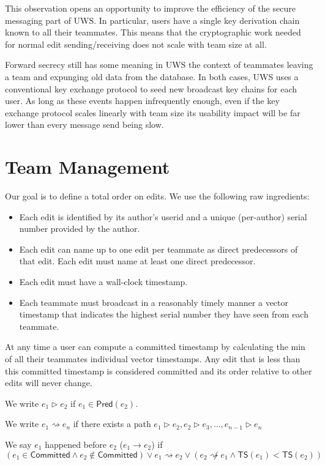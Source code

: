 \documentclass{article}
\begin{document}
This observation opens an opportunity to improve the efficiency of the secure messaging part of UWS.
In particular, users have a single key derivation chain known to all their teammates.
This means that the cryptographic work needed for normal edit sending{\slash}receiving does not scale with team size at all.

Forward secrecy still has some meaning in UWS the context of teammates leaving a team and expunging old data from the database.
In both cases, UWS uses a conventional key exchange protocol to seed new broadcast key chains for each user.
As long as these events happen infrequently enough, even if the key exchange protocol scales linearly with team size its usability impact will be far lower than every message send being slow.

\section{Team Management}

Our goal is to define a total order on edits.
We use the following raw ingredients:

\begin{itemize}
\item Each edit is identified by its author's userid and a unique (per-author) serial number provided by the author.
\item Each edit can name up to one edit per teammate as direct predecessors of that edit.
  Each edit must name at least one direct predecessor.
\item Each edit must have a wall-clock timestamp.
\item Each teammate must broadcast in a reasonably timely manner a vector timestamp that indicates the highest serial number they have seen from each teammate.
\end{itemize}

At any time a user can compute a committed timestamp by calculating the min of all their teammates individual vector timestamps.
Any edit that is less than this committed timestamp is considered committed and its order relative to other edits will never change.

We write $e_1{\rhd}e_2$ if $e_1 \in \mathsf{Pred}(e_2)$.

We write $e_1{\rightsquigarrow}e_n$ if there exists a path $e_1{\rhd}e_2, e_2{\rhd}e_3, \ldots, e_{n-1}{\rhd}e_n$

We say $e_1$ happened before $e_2$ ($e_1{\rightarrow}e_2$) if $(e_1 \in \mathsf{Committed} \land e_2 \not\in \mathsf{Committed}) \lor e_1{\rightsquigarrow}e_2 \lor (e_2{\not\rightsquigarrow}e_1 \land \mathsf{TS}(e_1)<\mathsf{TS}(e_2))$
\end{document}
